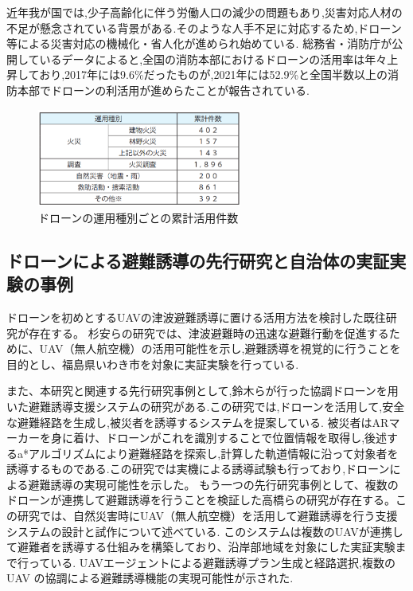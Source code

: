 近年我が国では,少子高齢化に伴う労働人口の減少の問題もあり,災害対応人材の不足が懸念されている背景がある.そのような人手不足に対応するため,ドローン等による災害対応の機械化・省人化が進められ始めている.
総務省・消防庁が公開しているデータ\cite{soumusho-01}によると,全国の消防本部におけるドローンの活用率は年々上昇しており,2017年には9.6\%だったものが,2021年には52.9\%と全国半数以上の消防本部でドローンの利活用が進めらたことが報告されている.
\begin{figure}[H] 
  \centering 
  \includegraphics[width=0.6\textwidth]{Figures/2024-11-28 215911.png}
  \caption{ドローンの運用種別ごとの累計活用件数} 
  \label{fig:01} 
\end{figure}



\subsection{ドローンによる避難誘導の先行研究と自治体の実証実験の事例}
ドローンを初めとするUAVの津波避難誘導に置ける活用方法を検討した既往研究が存在する。
杉安らの研究では、津波避難時の迅速な避難行動を促進するために、UAV（無人航空機）の活用可能性を示し,避難誘導を視覚的に行うことを目的とし、福島県いわき市を対象に実証実験を行っている\cite{sugiyasu2018uav}.

また、本研究と関連する先行研究事例として,鈴木らが行った協調ドローンを用いた避難誘導支援システムの研究がある\cite{suzuki2020drone}.この研究では,ドローンを活用して,安全な避難経路を生成し,被災者を誘導するシステムを提案している.
被災者はARマーカーを身に着け、ドローンがこれを識別することで位置情報を取得し,後述するa*アルゴリズムにより避難経路を探索し,計算した軌道情報に沿って対象者を誘導するものである.この研究では実機による誘導試験も行っており,ドローンによる避難誘導の実現可能性を示した。
もう一つの先行研究事例として、複数のドローンが連携して避難誘導を行うことを検証した高橋らの研究が存在する\cite{takahashi2018uav}。この研究では、自然災害時にUAV（無人航空機）を活用して避難誘導を行う支援システムの設計と試作について述べている.
このシステムは複数のUAVが連携して避難者を誘導する仕組みを構築しており、沿岸部地域を対象にした実証実験まで行っている. UAVエージェントによる避難誘導プラン生成と経路選択,複数の UAV の協調による避難誘導機能の実現可能性が示された.\par

